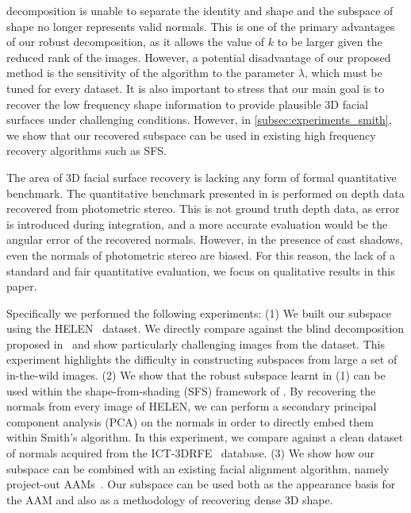 decomposition is unable to separate the identity and shape and the subspace of
shape no longer represents valid normals. This is one of the primary advantages
of our robust decomposition, as it allows the value of $k$ to be larger given
the reduced rank of the images. However, a potential disadvantage of our
proposed method is the sensitivity of the algorithm to the parameter $\lambda$,
which must be tuned for every dataset. It is also important to stress that our
main goal is to recover the low frequency shape information to provide plausible
3D facial surfaces under challenging conditions. However, in
\cref{subsec:experiments_smith}, we show that our recovered subspace can
be used in existing high frequency recovery algorithms such as SFS.\@

The area of 3D facial surface recovery is lacking any form of formal
quantitative benchmark. The quantitative benchmark presented in
\cite{KemelmacherShlizerman:2013iv} is performed on depth data recovered from photometric
stereo. This is not ground truth depth data, as error is introduced during
integration, and a more accurate evaluation would be the angular error of the
recovered normals. However, in the presence of cast shadows, even the normals of
photometric stereo are biased. For this reason, the lack of a standard and fair
quantitative evaluation, we focus on qualitative results in this paper.

Specifically we performed the following experiments: (1) We built our subspace
using the HELEN~\cite{le2012interactive} dataset. We directly compare against the
blind decomposition proposed in~\cite{KemelmacherShlizerman:2013iv} and show particularly
challenging images from the dataset. This experiment highlights the difficulty
in constructing subspaces from large a set of in-the-wild images. (2) We show
that the robust subspace learnt in (1) can be used within the shape-from-shading
(SFS) framework of \citet{smith2006recovering}. By recovering the normals
from every image of HELEN, we can perform a secondary principal component
analysis (PCA) on the normals in order to directly embed them within Smith's
algorithm. In this experiment, we compare against a clean dataset of normals
acquired from the ICT-3DRFE~\cite{stratou2012exploring} database. (3) We show how our
subspace can be combined with an existing facial alignment algorithm, namely
project-out AAMs~\cite{matthews2004active}. Our subspace can be used both as the
appearance basis for the AAM and also as a methodology of recovering dense 3D
shape.

